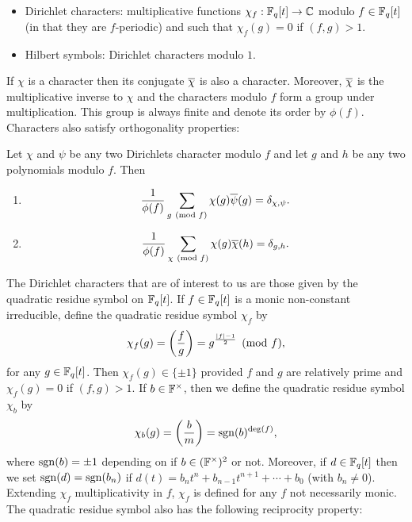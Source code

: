 \documentclass[12pt,reqno,oneside]{amsart}
\begin{document}
    \begin{itemize}
        \item Dirichlet characters: multiplicative functions $\chi_{f}:\mathbb{F}_{q}[t] \to \mathbb{C}$ modulo $f \in \mathbb{F}_{q}[t]$ (in that they are $f$-periodic) and such that $\chi_{f}(g) = 0$ if $(f,g) > 1$.
        \item Hilbert symbols: Dirichlet characters modulo $1$.
    \end{itemize}
    
    If $\chi$ is a character then its conjugate $\overline{\chi}$ is also a character. Moreover, $\overline{\chi}$ is the multiplicative inverse to $\chi$ and the characters modulo $f$ form a group under multiplication. This group is always finite and denote its order by $\phi(f)$. Characters also satisfy orthogonality properties:

    \begin{theorem}
        Let $\chi$ and $\psi$ be any two Dirichlets character modulo $f$ and let $g$ and $h$ be any two polynomials modulo $f$. Then
        \begin{enumerate}[label=(\roman*)]
          \item
          \[
            \frac{1}{\phi(f)}\sum_{g \ \left(\text{mod }f\right)}\chi(g)\overline{\psi}(g) = \delta_{\chi,\psi}.
          \]
          \item
          \[
            \frac{1}{\phi(f)}\sum_{\chi \ \left(\text{mod }f\right)}\chi(g)\overline{\chi}(h) = \delta_{g,h}.
          \]
        \end{enumerate}
    \end{theorem}

    The Dirichlet characters that are of interest to us are those given by the quadratic residue symbol on $\mathbb{F}_{q}[t]$. If $f \in \mathbb{F}_{q}[t]$ is a monic non-constant irreducible, define the quadratic residue symbol $\chi_{f}$ by
    \[
        \chi_{f}(g) = \left(\frac{f}{g}\right) = g^{\frac{|f|-1}{2}} \pmod{f},
    \]
    for any $g \in \mathbb{F}_{q}[t]$. Then $\chi_{f}(g) \in \{\pm 1\}$ provided $f$ and $g$ are relatively prime and $\chi_{f}(g) = 0$ if $(f,g) > 1$. If $b \in \mathbb{F}^{\times}$, then we define the quadratic residue symbol $\chi_{b}$ by
    \[
        \chi_{b}(g) = \left(\frac{b}{m}\right) = \operatorname{\mathrm{sgn}}(b)^{\deg(f)},
    \]
    where $\operatorname{\mathrm{sgn}}(b) = \pm1$ depending on if $b \in (\mathbb{F}^{\times})^{2}$ or not. Moreover, if $d \in \mathbb{F}_{q}[t]$ then we set $\operatorname{\mathrm{sgn}}(d) = \operatorname{\mathrm{sgn}}(b_{n})$ if $d(t) = b_{n}t^{n}+b_{n-1}t^{n+1}+\cdots+b_{0}$ (with $b_{n} \neq 0$). Extending $\chi_{f}$ multiplicativity in $f$, $\chi_{f}$ is defined for any $f$ not necessarily monic. The quadratic residue symbol also has the following reciprocity property:
\end{document}
